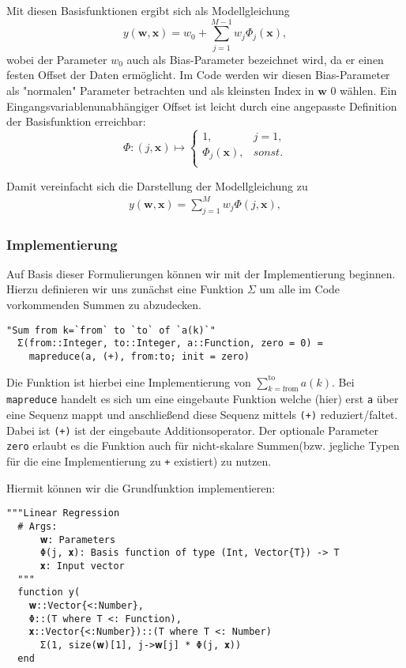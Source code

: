\documentclass{article}
\theoremstyle{plain} %
\theoremstyle{definition} %
\begin{document}
Mit diesen Basisfunktionen ergibt sich als Modellgleichung
$$
  y(\mathbf{w}, \mathbf{x}) = w_0 + \sum_{j=1}^{M-1}w_j\Phi_j(\mathbf{x}),
$$
wobei der Parameter $w_0$ auch als Bias-Parameter bezeichnet wird, da er einen festen Offset der Daten ermöglicht. Im Code werden wir diesen Bias-Parameter als "normalen" Parameter betrachten und als kleinsten Index in $\mathbf{w}$ $0$ wählen. Ein Eingangsvariablenunabhängiger Offset ist leicht durch eine angepasste Definition der Basisfunktion erreichbar:
\[ \Phi: (j, \mathbf{x}) \mapsto
 \left\{
  \begin{array}{ll}
    1,& j=1, \\
    \Phi_j(\mathbf{x}), & sonst. \\  
  \end{array}
\right. \]

Damit vereinfacht sich die Darstellung der Modellgleichung zu
\begin{align}
  y(\mathbf{w}, \mathbf{x}) = \sum_{j=1}^{M}w_j\Phi(j, \mathbf{x}),
\end{align}

\subsubsection{Implementierung}
Auf Basis dieser Formulierungen können wir mit der Implementierung beginnen.
Hierzu definieren wir uns zunächst eine Funktion \texttt{$\Sigma$} um alle im Code vorkommenden Summen zu abzudecken.

\begin{lstlisting}[caption={Funktion $\Sigma$}]
  "Sum from k=`from` to `to` of `a(k)`"
  Σ(from::Integer, to::Integer, a::Function, zero = 0) =
    mapreduce(a, (+), from:to; init = zero)
\end{lstlisting}

Die Funktion ist hierbei eine Implementierung von $\sum_{k=\text{from}}^\text{to}a(k)$. Bei \texttt{mapreduce} handelt es sich um eine eingebaute Funktion welche (hier) erst \texttt{a} über eine Sequenz mappt und anschließend diese Sequenz mittels \texttt{(+)} reduziert/faltet. Dabei ist \texttt{(+)} ist der eingebaute Additionsoperator. Der optionale Parameter \texttt{zero} erlaubt es die Funktion auch für nicht-skalare Summen(bzw. jegliche Typen für die eine Implementierung zu \texttt{+} existiert) zu nutzen.

Hiermit können wir die Grundfunktion implementieren:

\begin{lstlisting}[caption={Funktion \texttt{y}}]
  """Linear Regression
  # Args:
      𝐰: Parameters
      Φ(j, 𝐱): Basis function of type (Int, Vector{T}) -> T
      𝐱: Input vector
  """
  function y(
    𝐰::Vector{<:Number},
    Φ::(T where T <: Function),
    𝐱::Vector{<:Number})::(T where T <: Number)
      Σ(1, size(𝐰)[1], j->𝐰[j] * Φ(j, 𝐱))
  end
\end{lstlisting}
\end{document}
